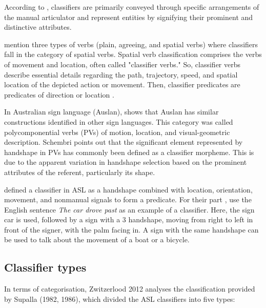 According to \textcite{zwitserlood2012}, classifiers are primarily conveyed through specific 
arrangements of the manual articulator and represent entities by signifying their 
prominent and distinctive attributes. 

\textcite{morgan2007} mention three types of verbs (plain, agreeing, and spatial 
verbs) where classifiers fall in the category of spatial verbs. Spatial verb 
classification comprises the verbs of movement and location, often called "classifier 
verbs." So, classifier verbs describe essential details regarding the path, 
trajectory, speed, and spatial location of the depicted action or movement. Then, 
classifier predicates are predicates of direction or location \parencite{zwitserlood2012}.

In Australian sign language (Auslan),\textcite{schembri1996structure} shows that Auslan has similar 
constructions identified in other sign languages. This category was called 
polycomponential verbs (PVs) of motion, location, and visual-geometric description.
Schembri points out that the significant element represented by handshape in PVs 
has commonly been defined as a classifier morpheme. This is due to the apparent 
variation in handshape selection based on the prominent attributes of the referent, 
particularly its shape.

\textcite{valli2001linguistics} defined a classifier in ASL as a handshape combined 
with location, orientation, movement, and nonmanual signals to form a predicate. For 
their part \textcite{valli2001linguistics}, use the English sentence \textit{The car drove past 
}as an example of a classifier. Here, the sign car is used, followed by a sign with a 
3 handshape, moving from right to left in front of the signer, with the palm facing 
in. A sign with the same handshape can be used to talk about the movement of a boat or a bicycle.
\newpage

\subsection{Classifier types}

In terms of categorisation, Zwitzerlood 2012 analyses the classification provided 
by Supalla (1982, 1986), which divided the ASL classifiers into five types: 

